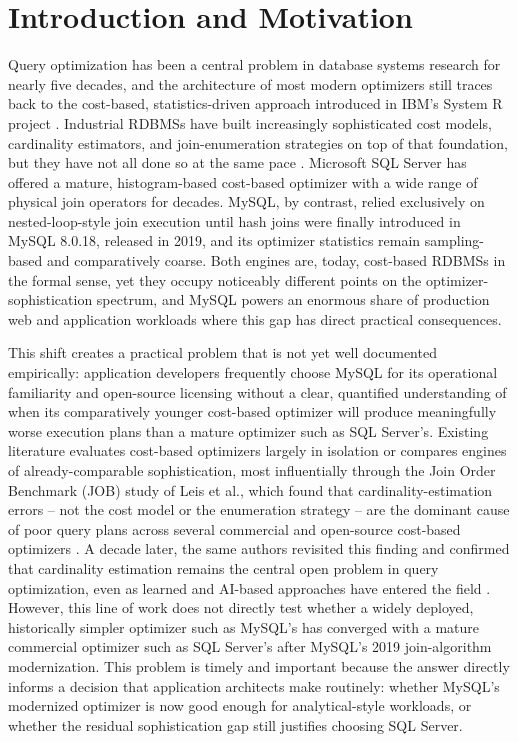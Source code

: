 \documentclass[conference]{IEEEtran}
\begin{document}
\section{Introduction and Motivation}
Query optimization has been a central problem in database systems research for nearly five decades, and the architecture of most modern optimizers still traces back to the cost-based, statistics-driven approach introduced in IBM's System R project \cite{selinger1979}. Industrial RDBMSs have built increasingly sophisticated cost models, cardinality estimators, and join-enumeration strategies on top of that foundation, but they have not all done so at the same pace \cite{chaudhuri1998}. Microsoft SQL Server has offered a mature, histogram-based cost-based optimizer with a wide range of physical join operators for decades. MySQL, by contrast, relied exclusively on nested-loop-style join execution until hash joins were finally introduced in MySQL 8.0.18, released in 2019, and its optimizer statistics remain sampling-based and comparatively coarse. Both engines are, today, cost-based RDBMSs in the formal sense, yet they occupy noticeably different points on the optimizer-sophistication spectrum, and MySQL powers an enormous share of production web and application workloads where this gap has direct practical consequences.

This shift creates a practical problem that is not yet well documented empirically: application developers frequently choose MySQL for its operational familiarity and open-source licensing without a clear, quantified understanding of when its comparatively younger cost-based optimizer will produce meaningfully worse execution plans than a mature optimizer such as SQL Server's. Existing literature evaluates cost-based optimizers largely in isolation or compares engines of already-comparable sophistication, most influentially through the Join Order Benchmark (JOB) study of Leis et al., which found that cardinality-estimation errors -- not the cost model or the enumeration strategy -- are the dominant cause of poor query plans across several commercial and open-source cost-based optimizers \cite{leis2015}. A decade later, the same authors revisited this finding and confirmed that cardinality estimation remains the central open problem in query optimization, even as learned and AI-based approaches have entered the field \cite{leis2025}. However, this line of work does not directly test whether a widely deployed, historically simpler optimizer such as MySQL's has converged with a mature commercial optimizer such as SQL Server's after MySQL's 2019 join-algorithm modernization. This problem is timely and important because the answer directly informs a decision that application architects make routinely: whether MySQL's modernized optimizer is now good enough for analytical-style workloads, or whether the residual sophistication gap still justifies choosing SQL Server.
\end{document}
